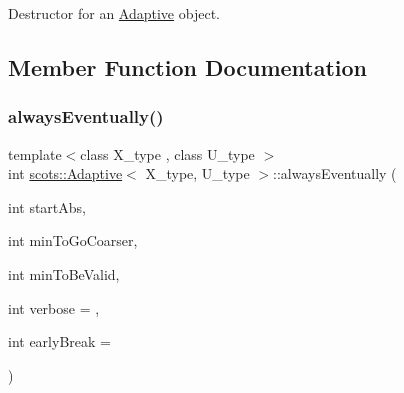 Destructor for an \hyperlink{classscots_1_1Adaptive}{Adaptive} object. 

\subsection{Member Function Documentation}
\mbox{\label{classscots_1_1Adaptive_a7823d9e433b00b740e56d0eabb920f7b}} 
\subsubsection{\texorpdfstring{always\+Eventually()}{alwaysEventually()}}
{\footnotesize\ttfamily template$<$class X\+\_\+type , class U\+\_\+type $>$ \\
int \hyperlink{classscots_1_1Adaptive}{scots\+::\+Adaptive}$<$ X\+\_\+type, U\+\_\+type $>$\+::always\+Eventually (\begin{DoxyParamCaption}\item[{int}]{start\+Abs,  }\item[{int}]{min\+To\+Go\+Coarser,  }\item[{int}]{min\+To\+Be\+Valid,  }\item[{int}]{verbose = {},  }\item[{int}]{early\+Break = {} }\end{DoxyParamCaption})\hspace{0.3cm}{\ttfamily [inline]}}

